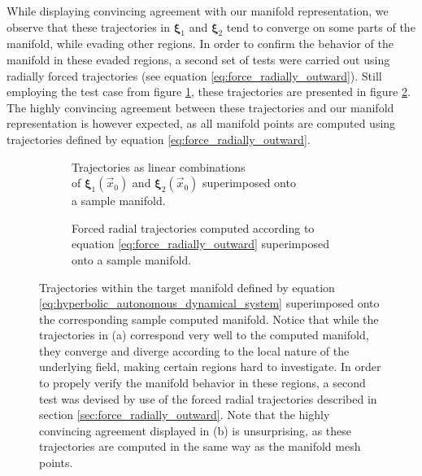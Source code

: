 While displaying convincing agreement with our manifold representation, we observe that these trajectories in $\bm{\xi}_1$ and $\bm{\xi}_2$ tend to converge on some parts of the manifold, while evading other regions. In order to confirm the behavior of the manifold in these evaded regions, a second set of tests were carried out using radially forced trajectories (see equation \eqref{eq:force_radially_outward}). Still employing the test case from figure \ref{fig:manifold_trajectories_a}, these trajectories are presented in figure \ref{fig:manifold_trajectories_b}. The highly convincing agreement between these trajectories and our manifold representation is however expected, as all manifold points are computed using trajectories defined by equation \eqref{eq:force_radially_outward}.

\begin{figure}[h!] 

\centering
\begin{subfigure}[b]{0.45\textwidth}
\centering

\caption{Trajectories as linear combinations\\ of $\bm{\xi}_1(\vec{x}_0)$ and $\bm{\xi}_2(\vec{x}_0)$ superimposed onto\\ a sample manifold.}\label{fig:manifold_trajectories_a}
\end{subfigure}
\begin{subfigure}[b]{0.45\textwidth}
\centering

\caption{Forced radial trajectories computed according to equation \eqref{eq:force_radially_outward} superimposed onto a sample manifold.}\label{fig:manifold_trajectories_b}
\end{subfigure}

\caption{Trajectories within the target manifold defined by equation \eqref{eq:hyperbolic_autonomous_dynamical_system} superimposed onto the corresponding sample computed manifold. Notice that while the trajectories in (a) correspond very well to the computed manifold, they converge and diverge according to the local nature of the underlying field, making certain regions hard to investigate. In order to propely verify the manifold behavior in these regions, a second test was devised by use of the forced radial trajectories described in section \ref{sec:force_radially_outward}. Note that the highly convincing agreement displayed in (b) is unsurprising, as these trajectories are computed in the same way as the manifold mesh points.}\label{fig:manifold_trajectories}
\end{figure}

